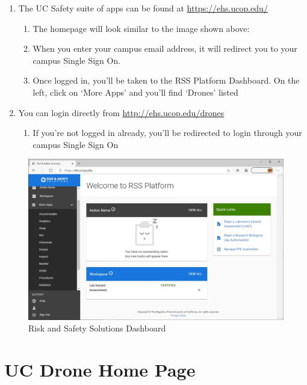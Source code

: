 \documentclass[
  12pt,
]{book}
\providecommand{\tightlist}{%
  \setlength{\itemsep}{0pt}\setlength{\parskip}{0pt}}
\begin{document}
\begin{enumerate}
\def\labelenumi{\arabic{enumi}.}
\tightlist
\item
  The UC Safety suite of apps can be found at \url{https://ehs.ucop.edu/}

  \begin{enumerate}
  \def\labelenumii{\arabic{enumii}.}
  \tightlist
  \item
    The homepage will look similar to the image shown above:
  \item
    When you enter your campus email address, it will redirect you to your campus Single Sign On.
  \item
    Once logged in, you'll be taken to the RSS Platform Dashboard. On the left, click on `More Apps' and you'll find `Drones' listed
  \end{enumerate}
\item
  You can login directly from \url{http://ehs.ucop.edu/drones}

  \begin{enumerate}
  \def\labelenumii{\arabic{enumii}.}
  \tightlist
  \item
    If you're not logged in already, you'll be redirected to login through your campus Single Sign On
  \end{enumerate}
\end{enumerate}

\begin{figure}

{\centering \includegraphics[width=0.85\linewidth]{images/RSS_apps} 

}

\caption{Risk and Safety Solutions Dashboard}\label{fig:rss-dash}
\end{figure}

\section{UC Drone Home Page}\label{UCDrones-home}
\end{document}
